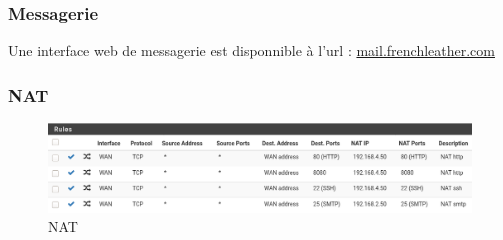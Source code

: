 \documentclass{beamer}
\begin{document}
		\begin{frame}
			\frametitle{Messagerie}
			Une interface web de messagerie est disponnible à l'url : \url{mail.frenchleather.com}
		\end{frame}
		\begin{frame}
			\frametitle{NAT}
			\begin{center}
				\begin{figure}
					\includegraphics[scale=.3]{nat.png}
					\caption{NAT}
				\end{figure}
			\end{center}
		\end{frame}
\end{document}
